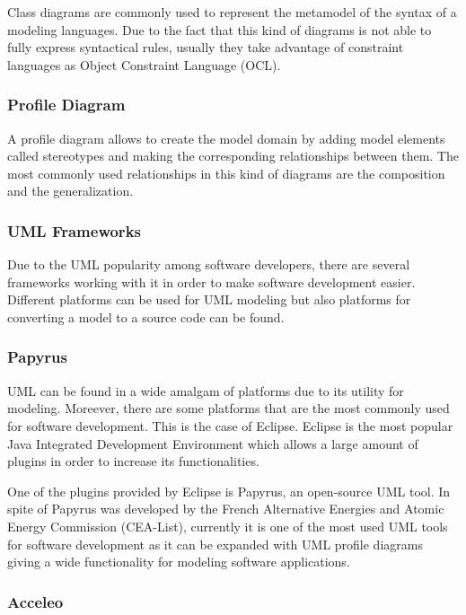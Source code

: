 Class diagrams are commonly used to represent the metamodel of the syntax of a modeling languages. Due to the fact that this kind of diagrams is not able to fully express syntactical rules, usually they take advantage of constraint languages as Object Constraint Language (OCL).

\subsubsection*{Profile Diagram}

A profile diagram allows to create the model domain by adding model elements called stereotypes and making the corresponding relationships between them. The most commonly used relationships in this kind of diagrams are the composition and the generalization.

\subsubsection{UML Frameworks}

Due to the UML popularity among software developers, there are several frameworks working with it in order to make software development easier. Different platforms can be used for UML modeling but also platforms for converting a model to a source code can be found.

\subsubsection*{Papyrus}

UML can be found in a wide amalgam of platforms due to its utility for modeling. Moreever, there are some platforms that are the most commonly used for software development. This is the case of Eclipse.  Eclipse is the most popular Java Integrated Development Environment which allows a large amount of plugins in order to increase its functionalities.

One of the plugins provided by Eclipse is Papyrus, an open-source UML tool. In spite of Papyrus was developed by the French Alternative Energies and Atomic Energy Commission (CEA-List), currently it is one of the most used UML tools for software development as it can be expanded with UML profile diagrams giving a wide functionality for modeling software applications.

\subsubsection*{Acceleo}

